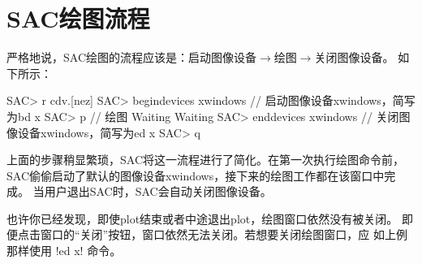 \section{SAC绘图流程}
严格地说，SAC绘图的流程应该是：启动图像设备$\rightarrow$绘图$\rightarrow$关闭图像设备。
如下所示：
\begin{SACCode}
SAC> r cdv.[nez]
SAC> begindevices xwindows      // 启动图像设备xwindows，简写为bd x
SAC> p                          // 绘图
Waiting
Waiting
SAC> enddevices xwindows        // 关闭图像设备xwindows，简写为ed x
SAC> q
\end{SACCode}

上面的步骤稍显繁琐，SAC将这一流程进行了简化。在第一次执行绘图命令前，
SAC偷偷启动了默认的图像设备xwindows，接下来的绘图工作都在该窗口中完成。
当用户退出SAC时，SAC会自动关闭图像设备。

也许你已经发现，即使plot结束或者中途退出plot，绘图窗口依然没有被关闭。
即便点击窗口的``关闭''按钮，窗口依然无法关闭。若想要关闭绘图窗口，应
如上例那样使用 !ed x! 命令。

